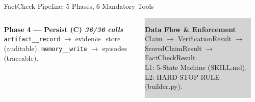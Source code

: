 \documentclass[aspectratio=169,11pt]{beamer}
\begin{document}
\begin{frame}{FactCheck Pipeline: 5 Phases, 6 Mandatory Tools}
\begin{columns}[T]
    \vspace{0.1cm}
    \colorbox{orange!14}{\begin{minipage}{\dimexpr\linewidth-2\fboxsep\relax}
      \footnotesize
      \textbf{Phase 4 --- Persist (C) \hspace{0.2cm} \textit{36/36 calls}}\\[2pt]
      \texttt{artifact\_\_record} $\to$ evidence\_store (auditable). \texttt{memory\_\_write} $\to$ episodes (traceable).
    \end{minipage}}

    \vspace{0.1cm}
    \colorbox{lightgray}{\begin{minipage}{\dimexpr\linewidth-2\fboxsep\relax}
      \footnotesize
      \textbf{Data Flow \& Enforcement}\\[2pt]
      Claim $\to$ VerificationResult $\to$ ScoredClaimResult $\to$ FactCheckResult.\\[1pt]
      L1: 5-State Machine (SKILL.md). L2: HARD STOP RULE (builder.py).
    \end{minipage}}
  \end{columns}
\end{frame}
\end{document}
